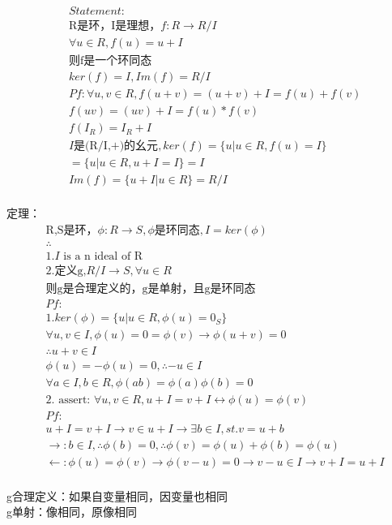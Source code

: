 \documentclass[12pt, a4paper]{article}  %
\begin{document}
\begin{align}
    &Statement:\\
    &\text{R是环，I是理想，}f:R\rightarrow R/I\\
    &\forall u\in R,f(u)=u+I\\
    &\text{则f是一个环同态}\\
    &ker(f)=I,Im(f)=R/I\\
    &Pf:\forall u,v\in R,f(u+v)=(u+v)+I=f(u)+f(v)\\
    &f(uv)=(uv)+I=f(u)*f(v)\\
    &f(I_R)=I_R+I\\
    &I\text{是(R/I,+)的幺元},ker(f)=\{u|u\in R,f(u)=I\}\\
    &=\{u|u\in R,u+I=I\}=I\\
    &Im(f)=\{u+I|u\in R\}=R/I\\
\end{align}

定理：
\begin{align}
    &\text{R,S是环，}\phi:R\rightarrow S,\phi \text{是环同态},I=ker(\phi)\\
    &\therefore \\
    &1.I\text{ is a n ideal of R}\\
    &2.\text{定义g,}R/I\rightarrow S,\forall u\in R\\
    &\text{则g是合理定义的，g是单射，且g是环同态}\\
    &Pf:\\
    &1.ker(\phi)=\{u|u\in R,\phi(u)=0_S\}\\
    &\forall u,v\in I,\phi(u)=0=\phi(v) \rightarrow \phi(u+v)=0\\
    &\therefore u+v\in I\\
    &\phi(u)=-\phi(u)=0,\therefore -u\in I\\
    &\forall a\in I,b\in R,\phi(ab)=\phi(a) \phi(b)=0\\
    &2.\text{ assert: }\forall u,v\in R,u+I=v+I\leftrightarrow \phi(u)=\phi(v)\\
    &Pf:\\
    & u+I=v+I\rightarrow v\in u+I\rightarrow \exists b\in I,st. v=u+b\\
    &\rightarrow : b\in I,\therefore \phi(b)=0,\therefore \phi(v)=\phi(u)+\phi(b)=\phi(u)\\
    &\leftarrow:\phi(u)=\phi(v)\rightarrow \phi(v-u)=0\rightarrow v-u\in I\rightarrow v+I=u+I\\
\end{align}


g合理定义：如果自变量相同，因变量也相同\\
g单射：像相同，原像相同
\end{document}
